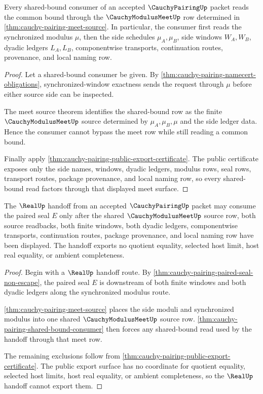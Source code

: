 \begin{theorem}
\label{thm:cauchy-pairing-shared-bound-consumer}
Every shared-bound consumer of an accepted $\CauchyPairingUp$ packet reads the common bound through the $\CauchyModulusMeetUp$ row determined in \autoref{thm:cauchy-pairing-meet-source}. In particular, the consumer first reads the synchronized modulus $\mu$, then the side schedules $\mu_A,\mu_B$, side windows $W_A,W_B$, dyadic ledgers $L_A,L_B$, componentwise transports, continuation routes, provenance, and local naming row.
\end{theorem}
\begin{proof}
Let a shared-bound consumer be given. By \autoref{thm:cauchy-pairing-namecert-obligations}, synchronized-window exactness sends the request through $\mu$ before either source side can be inspected.

The meet source theorem identifies the shared-bound row as the finite $\CauchyModulusMeetUp$ source determined by $\mu_A,\mu_B,\mu$ and the side ledger data. Hence the consumer cannot bypass the meet row while still reading a common bound.

Finally apply \autoref{thm:cauchy-pairing-public-export-certificate}. The public certificate exposes only the side names, windows, dyadic ledgers, modulus rows, seal rows, transport routes, package provenance, and local naming row, so every shared-bound read factors through that displayed meet surface.
\end{proof}

\begin{theorem}
\label{thm:cauchy-pairing-real-handoff-non-escape}
The $\RealUp$ handoff from an accepted $\CauchyPairingUp$ packet may consume the paired seal $E$ only after the shared $\CauchyModulusMeetUp$ source row, both source readbacks, both finite windows, both dyadic ledgers, componentwise transports, continuation routes, package provenance, and local naming row have been displayed. The handoff exports no quotient equality, selected host limit, host real equality, or ambient completeness.
\end{theorem}
\begin{proof}
Begin with a $\RealUp$ handoff route. By \autoref{thm:cauchy-pairing-paired-seal-non-escape}, the paired seal $E$ is downstream of both finite windows and both dyadic ledgers along the synchronized modulus route.

\autoref{thm:cauchy-pairing-meet-source} places the side moduli and synchronized modulus into one shared $\CauchyModulusMeetUp$ source row. \autoref{thm:cauchy-pairing-shared-bound-consumer} then forces any shared-bound read used by the handoff through that meet row.

The remaining exclusions follow from \autoref{thm:cauchy-pairing-public-export-certificate}. The public export surface has no coordinate for quotient equality, selected host limits, host real equality, or ambient completeness, so the $\RealUp$ handoff cannot export them.
\end{proof}

